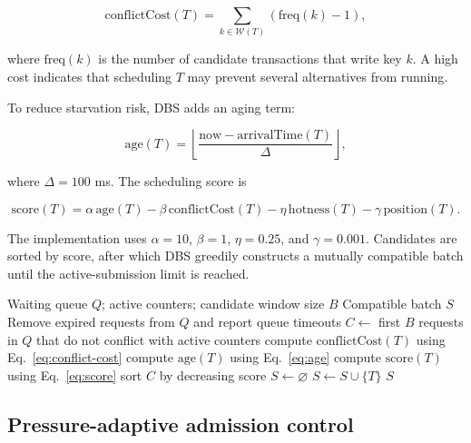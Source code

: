 \documentclass[fleqn,10pt,lineno]{wlpeerj}
\newcommand{\Wset}{\mathcal{W}}
\begin{document}
\begin{equation}
\mathrm{conflictCost}(T)=\sum_{k\in\Wset(T)}(\mathrm{freq}(k)-1),
\label{eq:conflict-cost}
\end{equation}

where $\mathrm{freq}(k)$ is the number of candidate transactions that write key $k$. A high cost indicates that scheduling $T$ may prevent several alternatives from running.

To reduce starvation risk, DBS adds an aging term:

\begin{equation}
\mathrm{age}(T)=\left\lfloor
\frac{\mathrm{now}-\mathrm{arrivalTime}(T)}{\Delta}
\right\rfloor,
\label{eq:age}
\end{equation}

where $\Delta=100$ ms. The scheduling score is

\begin{equation}
\mathrm{score}(T)=
\alpha\,\mathrm{age}(T)
-\beta\,\mathrm{conflictCost}(T)
-\eta\,\mathrm{hotness}(T)
-\gamma\,\mathrm{position}(T).
\label{eq:score}
\end{equation}

The implementation uses $\alpha=10$, $\beta=1$, $\eta=0.25$, and $\gamma=0.001$. Candidates are sorted by score, after which DBS greedily constructs a mutually compatible batch until the active-submission limit is reached.

\begin{algorithm}[ht]
\caption{DBS: dependency-aware batch selection}
\label{alg:dbs}
\begin{algorithmic}[1]
\Require Waiting queue $Q$; active counters; candidate window size $B$
\Ensure Compatible batch $S$
\State Remove expired requests from $Q$ and report queue timeouts
\State $C \gets$ first $B$ requests in $Q$ that do not conflict with active counters
  \State compute $\mathrm{conflictCost}(T)$ using Eq.~\eqref{eq:conflict-cost}
  \State compute $\mathrm{age}(T)$ using Eq.~\eqref{eq:age}
  \State compute $\mathrm{score}(T)$ using Eq.~\eqref{eq:score}
\EndFor
\State sort $C$ by decreasing score
\State $S\gets\varnothing$
    \State $S\gets S\cup\{T\}$
  \EndIf
\EndFor
\State \Return $S$
\end{algorithmic}
\end{algorithm}

\subsection*{Pressure-adaptive admission control}
\end{document}
